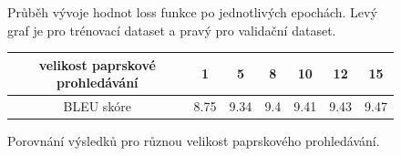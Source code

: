 \begin{figure}[H]
    \begin{center}
    \end{center}
	\caption{Průběh vývoje hodnot loss funkce po jednotlivých epochách. Levý graf je pro trénovací dataset a pravý pro validační dataset.}
\end{figure}

\begin{figure}[H]
    \begin{center}
        \begin{tabular}{c|c|c|c|c|c|c}
          velikost paprskové prohledávání & 1 & 5 & 8 & 10 & 12 & 15 \\
          \hline
          BLEU skóre & 8.75 & 9.34 & 9.4 & 9.41 & 9.43 & 9.47\\
          \hline
        \end{tabular}
    \end{center}
	\caption{Porovnání výsledků pro různou velikost paprskového prohledávání.}
	\label{table:resultsExperiment4}
\end{figure}

